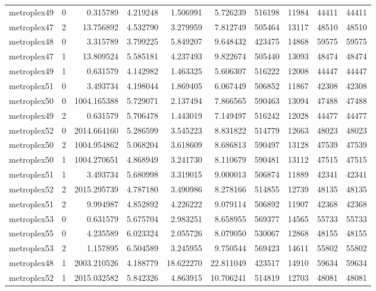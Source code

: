 \begin{longtable}{|l|r|r|r|r|r|r|r|r|r|}
metroplex49 & 0 & 0.315789 & 4.219248 & 1.506991 & 5.726239 & 516198 & 11984 & 44411 & 44411 \\
metroplex47 & 2 & 13.756892 & 4.532790 & 3.279959 & 7.812749 & 505464 & 13117 & 48510 & 48510 \\
metroplex48 & 0 & 3.315789 & 3.799225 & 5.849207 & 9.648432 & 423475 & 14868 & 59575 & 59575 \\
metroplex47 & 1 & 13.809524 & 5.585181 & 4.237493 & 9.822674 & 505440 & 13093 & 48474 & 48474 \\
metroplex49 & 1 & 0.631579 & 4.142982 & 1.463325 & 5.606307 & 516222 & 12008 & 44447 & 44447 \\
metroplex51 & 0 & 3.493734 & 4.198044 & 1.869405 & 6.067449 & 506852 & 11867 & 42308 & 42308 \\
metroplex50 & 0 & 1004.165388 & 5.729071 & 2.137494 & 7.866565 & 590463 & 13094 & 47488 & 47488 \\
metroplex49 & 2 & 0.631579 & 5.706478 & 1.443019 & 7.149497 & 516242 & 12028 & 44477 & 44477 \\
metroplex52 & 0 & 2014.664160 & 5.286599 & 3.545223 & 8.831822 & 514779 & 12663 & 48023 & 48023 \\
metroplex50 & 2 & 1004.954862 & 5.068204 & 3.618609 & 8.686813 & 590497 & 13128 & 47539 & 47539 \\
metroplex50 & 1 & 1004.270651 & 4.868949 & 3.241730 & 8.110679 & 590481 & 13112 & 47515 & 47515 \\
metroplex51 & 1 & 3.493734 & 5.680998 & 3.319015 & 9.000013 & 506874 & 11889 & 42341 & 42341 \\
metroplex52 & 2 & 2015.295739 & 4.787180 & 3.490986 & 8.278166 & 514855 & 12739 & 48135 & 48135 \\
metroplex51 & 2 & 9.994987 & 4.852892 & 4.226222 & 9.079114 & 506892 & 11907 & 42368 & 42368 \\
metroplex53 & 0 & 0.631579 & 5.675704 & 2.983251 & 8.658955 & 569377 & 14565 & 55733 & 55733 \\
metroplex55 & 0 & 4.235589 & 6.023324 & 2.055726 & 8.079050 & 530067 & 12868 & 48155 & 48155 \\
metroplex53 & 2 & 1.157895 & 6.504589 & 3.245955 & 9.750544 & 569423 & 14611 & 55802 & 55802 \\
metroplex48 & 1 & 2003.210526 & 4.188779 & 18.622270 & 22.811049 & 423517 & 14910 & 59634 & 59634 \\
metroplex52 & 1 & 2015.032582 & 5.842326 & 4.863915 & 10.706241 & 514819 & 12703 & 48081 & 48081 \\

\end{longtable}
